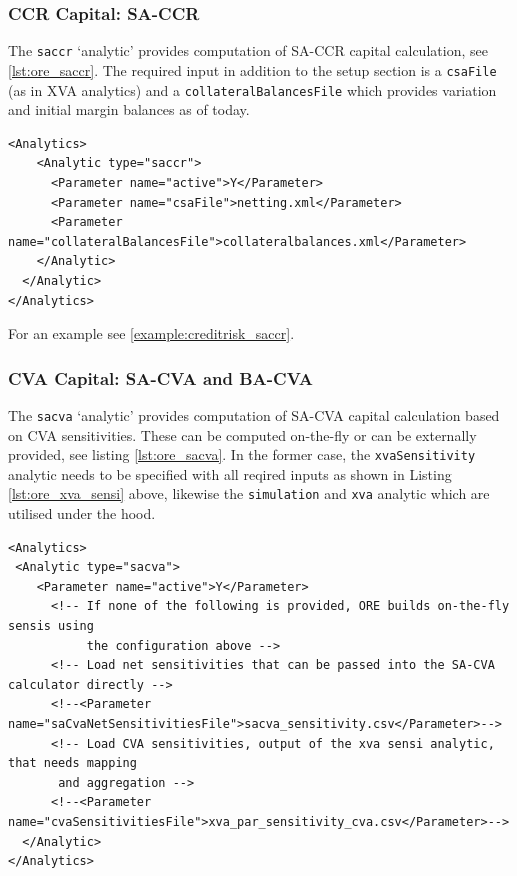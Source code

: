 \subsubsection{CCR Capital: SA-CCR}

The {\tt saccr} `analytic' provides computation of SA-CCR capital calculation, see \ref{lst:ore_saccr}. The required input in
addition to the setup section is a {\tt csaFile} (as in XVA analytics) and a {\tt collateralBalancesFile} which provides variation and initial margin balances as of today.

\begin{listing}[H]
\begin{verbatim}
<Analytics>
    <Analytic type="saccr">
      <Parameter name="active">Y</Parameter>
      <Parameter name="csaFile">netting.xml</Parameter>
      <Parameter name="collateralBalancesFile">collateralbalances.xml</Parameter>
    </Analytic>
  </Analytic>
</Analytics>
\end{verbatim}
\caption{ORE analytic: SA-CCR}
\label{lst:ore_saccr}
\end{listing}

For an example see \ref{example:creditrisk_saccr}.

\subsubsection{CVA Capital: SA-CVA and BA-CVA}

The {\tt sacva} `analytic' provides computation of SA-CVA capital calculation based on CVA sensitivities.
These can be computed on-the-fly or can be externally provided, see listing \ref{lst:ore_sacva}. In the former case,
the {\tt xvaSensitivity} analytic needs to be specified with all reqired inputs as shown in Listing \ref{lst:ore_xva_sensi} above,
likewise the {\tt simulation} and {\tt xva} analytic which are utilised under the hood.

\begin{listing}[H]
\begin{verbatim}
<Analytics>
 <Analytic type="sacva">
    <Parameter name="active">Y</Parameter>
      <!-- If none of the following is provided, ORE builds on-the-fly sensis using
           the configuration above -->
      <!-- Load net sensitivities that can be passed into the SA-CVA calculator directly -->
      <!--<Parameter name="saCvaNetSensitivitiesFile">sacva_sensitivity.csv</Parameter>-->
      <!-- Load CVA sensitivities, output of the xva sensi analytic, that needs mapping
	   and aggregation -->
      <!--<Parameter name="cvaSensitivitiesFile">xva_par_sensitivity_cva.csv</Parameter>-->
  </Analytic>
</Analytics>
\end{verbatim}
\caption{ORE analytic: SA-CVA}
\label{lst:ore_sacva}
\end{listing}

